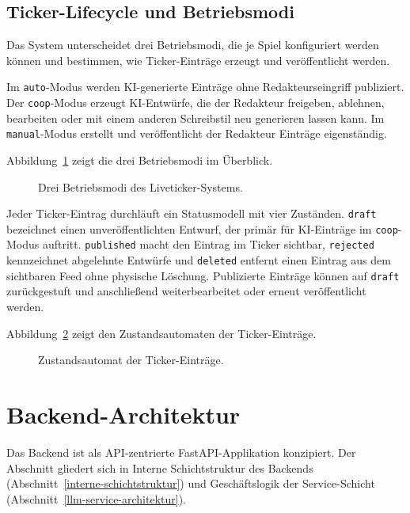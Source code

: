 \newpage
\subsection{Ticker-Lifecycle und Betriebsmodi}\label{status-lifecycle-und-betriebsmodi}

Das System unterscheidet drei Betriebsmodi, die je Spiel konfiguriert werden können und bestimmen, wie Ticker-Einträge erzeugt und veröffentlicht werden.

Im \texttt{auto}-Modus werden KI-generierte Einträge ohne Redakteurseingriff publiziert. Der \texttt{coop}-Modus erzeugt KI-Entwürfe, die der Redakteur freigeben, ablehnen, bearbeiten oder mit einem anderen Schreibstil neu generieren lassen kann. Im \texttt{manual}-Modus erstellt und veröffentlicht der Redakteur Einträge eigenständig.

Abbildung~\ref{fig:betriebsmodi} zeigt die drei Betriebsmodi im Überblick.

\begin{figure}[H]
\centering
\DiagramBetriebsmodi
\caption[Drei Betriebsmodi des Liveticker-Systems]{Drei Betriebsmodi des Liveticker-Systems.}
\label{fig:betriebsmodi}
\end{figure}

Jeder Ticker-Eintrag durchläuft ein Statusmodell mit vier Zuständen. \texttt{draft} bezeichnet einen unveröffentlichten Entwurf, der primär für KI-Einträge im \texttt{coop}-Modus auftritt. \texttt{published} macht den Eintrag im Ticker sichtbar, \texttt{rejected} kennzeichnet abgelehnte Entwürfe und \texttt{deleted} entfernt einen Eintrag aus dem sichtbaren Feed ohne physische Löschung. Publizierte Einträge können auf \texttt{draft} zurückgestuft und anschließend weiterbearbeitet oder erneut veröffentlicht werden.

Abbildung~\ref{fig:zustandsautomat} zeigt den Zustandsautomaten der Ticker-Einträge.

\begin{figure}[H]
\centering
\DiagramTickerStates
\caption[Zustandsautomat der Ticker-Einträge]{Zustandsautomat der Ticker-Einträge.}
\label{fig:zustandsautomat}
\end{figure}



\section{Backend-Architektur}\label{backend-konzeption}

Das Backend ist als API-zentrierte FastAPI-Applikation konzipiert. Der Abschnitt gliedert sich in Interne Schichtstruktur des Backends (Abschnitt~\ref{interne-schichtstruktur}) und Geschäftslogik der Service-Schicht (Abschnitt~\ref{llm-service-architektur}).

